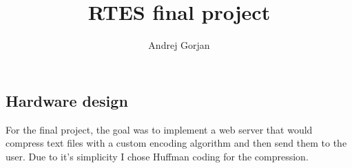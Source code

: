\documentclass{article}
\title{RTES final project}
\author{Andrej Gorjan}
\begin{document}
\maketitle

\begin{multicols}{2}

\section{Hardware design}
For the final project, the goal was to implement a web server that would compress text files with a custom encoding algorithm and then send them to the user. Due to it's simplicity I chose Huffman coding for the compression.


\end{multicols}
 
\end{document}
